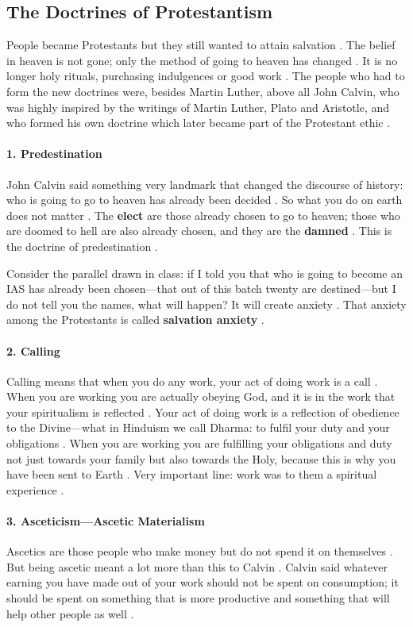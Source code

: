 \subsection{The Doctrines of Protestantism}
People became Protestants but they still wanted to attain salvation . The belief in heaven is not gone; only the method of going to heaven has changed . It is no longer holy rituals, purchasing indulgences or good work . The people who had to form the new doctrines were, besides Martin Luther, above all John Calvin, who was highly inspired by the writings of Martin Luther, Plato and Aristotle, and who formed his own doctrine which later became part of the Protestant ethic .

\paragraph{1. Predestination}
\begin{KeyConcept}
John Calvin said something very landmark that changed the discourse of history: who is going to go to heaven has already been decided . So what you do on earth does not matter .
The \textbf{elect} are those already chosen to go to heaven; those who are doomed to hell are also already chosen, and they are the \textbf{damned} .
This is the doctrine of predestination .
\end{KeyConcept}

Consider the parallel drawn in class: if I told you that who is going to become an IAS has already been chosen---that out of this batch twenty are destined---but I do not tell you the names, what will happen? It will create anxiety .
That anxiety among the Protestants is called \textbf{salvation anxiety} .

\paragraph{2. Calling}
Calling means that when you do any work, your act of doing work is a call . When you are working you are actually obeying God, and it is in the work that your spiritualism is reflected .
Your act of doing work is a reflection of obedience to the Divine---what in Hinduism we call Dharma: to fulfil your duty and your obligations .
When you are working you are fulfilling your obligations and duty not just towards your family but also towards the Holy, because this is why you have been sent to Earth .
Very important line: work was to them a spiritual experience .

\paragraph{3. Asceticism---Ascetic Materialism}
Ascetics are those people who make money but do not spend it on themselves .
But being ascetic meant a lot more than this to Calvin . Calvin said whatever earning you have made out of your work should not be spent on consumption; it should be spent on something that is more productive and something that will help other people as well .

